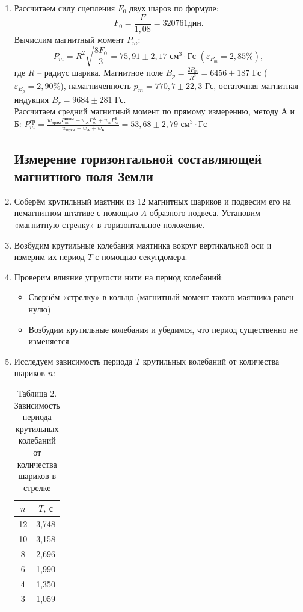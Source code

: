 \documentclass[a4paper]{article}
\begin{document}
\begin{enumerate}
    \item Рассчитаем силу сцепления $F_0$ двух шаров по формуле:
    \[
    F_0 = \frac{F}{1,08} = 320761 \text{дин}.
    \]
    Вычислим магнитный момент $P_m$:
    \[
    P_m = R^2 \sqrt{\frac{8F_0}{3}} = 75,91 \pm 2,17 \text{ см}^3 \cdot \text{Гс } (\varepsilon_{P_m} = 2,85 \%), 
    \]
    где $R$ -- радиус шарика. Магнитное поле $B_p = \frac{2 P_m}{R^3} = 6456 \pm 187$ Гс ($\varepsilon_{B_p} = 2,90 \%$), намагниченность $p_m = 770,7 \pm 22,3$ Гс, остаточная магнитная индукция $B_r = 9684 \pm 281$ Гс. \\

Рассчитаем средний магнитный момент по прямому измерению, методу А и Б: $P_m^\text{ср} = \frac{w_\text{прям} P_m^\text{прям} + w_\text{А} P_m^\text{А} + w_\text{Б} P_m^\text{Б}}{w_\text{прям} + w_\text{А} + w_\text{Б}} = 53,68 \pm 2,79\text{ см}^3 \cdot \text{Гс }$

\subsection*{Измерение горизонтальной составляющей магнитного поля Земли}

    \item Соберём крутильный маятник из 12 магнитных шариков и подвесим его на немагнитном штативе с помощью $\Lambda$-образного подвеса. Установим «магнитную стрелку» в горизонтальное положение.
    
    \item Возбудим крутильные колебания маятника вокруг вертикальной оси и измерим их период $T$ с помощью секундомера.
    
    \item Проверим влияние упругости нити на период колебаний:
    \begin{itemize}
        \item Свернём «стрелку» в кольцо (магнитный момент такого маятника равен нулю)
        \item Возбудим крутильные колебания и убедимся, что период существенно не изменяется
    \end{itemize}
    
    \item Исследуем зависимость периода $T$ крутильных колебаний от количества шариков $n$:
    \begin{table}[h!]
    \centering
    \begin{tabular}{|c|c|}
        \hline
        $n$ & $T,\ \text{с}$ \\ \hline
        12 & 3,748 \\ \hline
        10 & 3,158 \\ \hline
        8 & 2,696 \\ \hline
        6 & 1,990 \\ \hline
        4 & 1,350 \\ \hline
        3 & 1,059 \\ \hline
    \end{tabular}
    \caption{Таблица 2. Зависимость периода крутильных колебаний от количества шариков в стрелке}
    \label{tab:T_n}
\end{table}


\end{enumerate}
\end{document}
